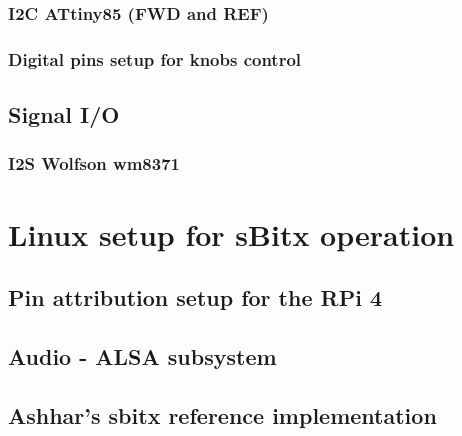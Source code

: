 \documentclass[11pt,a4paper]{article}
\begin{document}
\subsubsection{I2C ATtiny85 (FWD and REF)}

\subsubsection{Digital pins setup for knobs control}

\subsection{Signal I/O}

\subsubsection{I2S Wolfson wm8371}

\section{Linux setup for sBitx operation}

\subsection{Pin attribution setup for the RPi 4}

\subsection{Audio - ALSA subsystem}

\subsection{Ashhar's sbitx reference implementation}
\end{document}
